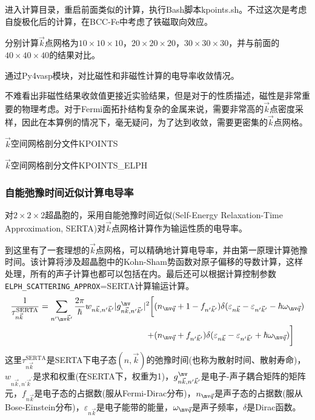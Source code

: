 {进入计算目录，重启前面类似的计算，执行\textrm{Bash}脚本\textrm{kpoints.sh}。不过这次是考虑自旋极化后的计算，在\textrm{BCC-Fe}中考虑了铁磁取向效应。

分别计算$\vec k$点网格为$10\times10\times10$，$20\times20\times20$，$30\times30\times30$，并与前面的$40\times40\times40$的结果对比。

通过\textrm{Py4vasp}模块，对比磁性和非磁性计算的电导率收敛情况。

不难看出非磁性结果收敛值更接近实验结果，但是对于的性质描述，磁性是非常重要的物理考虑。对于\textrm{Fermi}面拓扑结构复杂的金属来说，需要非常高的$\vec k$点密度采样，因此在本算例的情况下，毫无疑问，为了达到收敛，需要更密集的$\vec k$点网格。

$\vec k$空间网格剖分文件\textrm{KPOINTS}

$\vec k$空间网格剖分文件\textrm{KPOINTS\_ELPH}
\subsubsection{自能弛豫时间近似计算电导率}
对$2\times2\times2$超晶胞的，采用自能弛豫时间近似\textrm{(Self-Energy Relaxation-Time Approximation, SERTA)}对$\vec k$点网格计算作为输运性质的电导率。

到这里有了一套理想的$\vec k$点网格，可以精确地计算电导率，并由第一原理计算弛豫时间。该计算将涉及超晶胞中的\textrm{Kohn-Sham}势函数对原子偏移的导数计算，这样处理，所有的声子计算也都可以包括在内。最后还可以根据计算控制参数\texttt{ELPH\_SCATTERING\_APPROX}=\textrm{SERTA}计算输运计算。
\begin{displaymath}
	\begin{aligned}
		\dfrac1{\tau_{n\vec k}^{\mathrm{SERTA}}}=\sum_{n^{\prime}\nv\vec k^{\prime}}\dfrac{2\pi}{\hbar}w_{n\vec k,n^{\prime}\vec k^{\prime}}|g_{n\vec k,n^{\prime}\vec k^{\prime}}^{\nv}|^2\bigg[&(n_{\nv\vec q}+1-f_{n^{\prime}\vec k^{\prime}})\delta(\varepsilon_{n\vec k}-\varepsilon_{n^{\prime}\vec k^{\prime}}-\hbar\omega_{\nv\vec q})\\
			+&(n_{\nv\vec q}+f_{n^{\prime}\vec k^{\prime}})\delta(\varepsilon_{n\vec k}-\varepsilon_{n^{\prime}\vec k^{\prime}}+\hbar\omega_{\nv\vec q})\bigg]
	\end{aligned}
\end{displaymath}
这里$\tau_{n\vec k}^{\mathrm{SERTA}}$是\textrm{SERTA}下电子态$(n,\vec k)$的弛豫时间(也称为散射时间、散射寿命)，$w_{n\vec k,n^{\prime}\vec k^{\prime}}$是求和权重(在\textrm{SERTA}下，权重为1)，$g_{n\vec k,n^{\prime}\vec k^{\prime}}^{\nv}$是电子-声子耦合矩阵的矩阵元，$f_{n\vec k}$是电子态的占据数(服从\textrm{Fermi-Dirac}分布)，$n_{\nv\vec q}$是声子态的占据数(服从\textrm{Bose-Einstein}分布)，$\varepsilon_{n\vec k}$是电子能带的能量，$\omega_{\nv\vec q}$是声子频率，$\delta$是\textrm{Dirac}函数。

}
